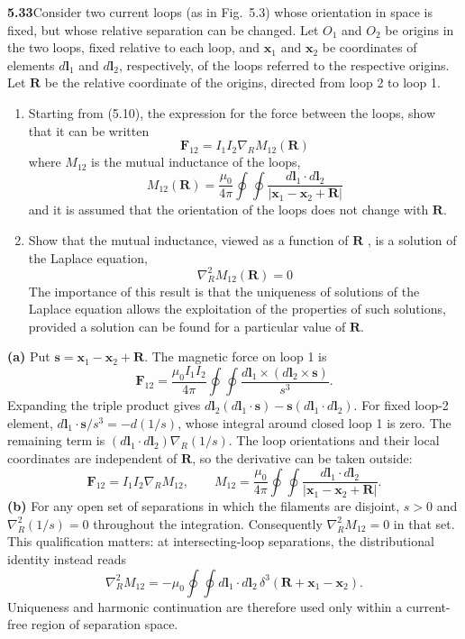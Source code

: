 \par\bigskip
\noindent\textbf{5.33}\quad Consider two current loops (as in Fig.~5.3) whose orientation in space is fixed, but whose relative separation can be changed. Let $O_{1}$ and $O_{2}$ be origins in the two loops, fixed relative to each loop, and $\mathbf{x}_{1}$ and $\mathbf{x}_{2}$ be coordinates of elements $d\mathbf{l}_{1}$ and $d\mathbf{l}_{2}$, respectively, of the loops referred to the respective origins. Let $\mathbf{R}$ be the relative coordinate of the origins, directed from loop 2 to loop 1.
\begin{enumerate}
\item[(a)] Starting from (5.10), the expression for the force between the loops, show that it can be written
\[
\mathbf{F}_{12}=I_{1}I_{2}\nabla_{R}M_{12}(\mathbf{R})
\]
where $M_{12}$ is the mutual inductance of the loops,
\[
M_{12}(\mathbf{R})=\frac{\mu_{0}}{4\pi}\oint\oint\frac{d\mathbf{l}_{1}\cdot d\mathbf{l}_{2}}{|\mathbf{x}_{1}-\mathbf{x}_{2}+\mathbf{R}|}
\]
and it is assumed that the orientation of the loops does not change with $\mathbf{R}$.
\item[(b)] Show that the mutual inductance, viewed as a function of $\mathbf{R}$ , is a solution of the Laplace equation,
\[
\nabla_{R}^{2}M_{12}(\mathbf{R})=0
\]
The importance of this result is that the uniqueness of solutions of the Laplace equation allows the exploitation of the properties of such solutions, provided a solution can be found for a particular value of $\mathbf{R}$.
\end{enumerate}
\solution
\textbf{(a)} Put
$\mathbf s=\mathbf x_1-\mathbf x_2+\mathbf R$.
The magnetic force on loop 1 is
\[
\mathbf F_{12}=\frac{\mu_0I_1I_2}{4\pi}
\oint\oint\frac{d\mathbf l_1\times(d\mathbf l_2\times\mathbf s)}{s^3}.
\]
Expanding the triple product gives
$d\mathbf l_2(d\mathbf l_1\cdot\mathbf s)
-\mathbf s(d\mathbf l_1\cdot d\mathbf l_2)$.
For fixed loop-2 element,
$d\mathbf l_1\cdot\mathbf s/s^3=-d(1/s)$, whose integral around
closed loop 1 is zero. The remaining term is
$(d\mathbf l_1\cdot d\mathbf l_2)\nabla_R(1/s)$.
The loop orientations and their local coordinates are independent
of $\mathbf R$, so the derivative can be taken outside:
\[
\boxed{\mathbf F_{12}=I_1I_2\nabla_RM_{12},\qquad
M_{12}=\frac{\mu_0}{4\pi}\oint\oint
\frac{d\mathbf l_1\cdot d\mathbf l_2}{|\mathbf x_1-\mathbf x_2+\mathbf R|}.}
\]
\textbf{(b)} For any open set of separations in which the filaments
are disjoint, $s>0$ and $\nabla_R^2(1/s)=0$ throughout the integration.
Consequently $\boxed{\nabla_R^2M_{12}=0}$ in that set.
This qualification matters: at intersecting-loop separations, the
distributional identity instead reads
\[
\nabla_R^2M_{12}=-\mu_0\oint\oint d\mathbf l_1\cdot d\mathbf l_2\,
\delta^3(\mathbf R+\mathbf x_1-\mathbf x_2).
\]
Uniqueness and harmonic continuation are therefore used only within
a current-free region of separation space.



